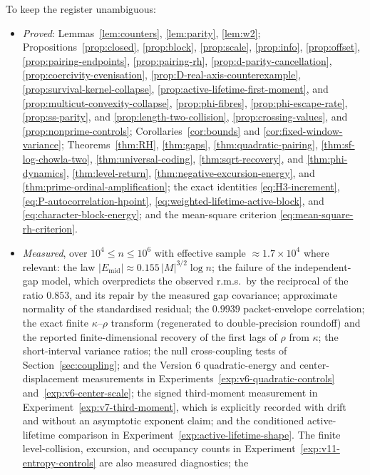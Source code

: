 \documentclass[11pt]{amsart}
\numberwithin{equation}{section}
\theoremstyle{plain}
\theoremstyle{definition}
\theoremstyle{remark}
\newcommand{\Mert}{M}
\begin{document}
To keep the register unambiguous:
\begin{itemize}[leftmargin=1.6em]
\item \emph{Proved}: Lemmas~\ref{lem:counters}, \ref{lem:parity}, \ref{lem:w2};
Propositions~\ref{prop:closed}, \ref{prop:block}, \ref{prop:scale},
\ref{prop:info}, \ref{prop:offset}, \ref{prop:pairing-endpoints},
\ref{prop:pairing-rh}, \ref{prop:d-parity-cancellation},
\ref{prop:coercivity-evenisation}, \ref{prop:D-real-axis-counterexample},
\ref{prop:survival-kernel-collapse}, \ref{prop:active-lifetime-first-moment},
and \ref{prop:multicut-convexity-collapse}, \ref{prop:phi-fibres},
\ref{prop:phi-escape-rate}, \ref{prop:ss-parity}, and
\ref{prop:length-two-collision}, \ref{prop:crossing-values}, and
\ref{prop:nonprime-controls}; Corollaries~\ref{cor:bounds} and
\ref{cor:fixed-window-variance}; Theorems~\ref{thm:RH}, \ref{thm:gaps},
\ref{thm:quadratic-pairing}, \ref{thm:sf-log-chowla-two},
\ref{thm:universal-coding}, \ref{thm:sqrt-recovery}, and
\ref{thm:phi-dynamics}, \ref{thm:level-return},
\ref{thm:negative-excursion-energy}, and
\ref{thm:prime-ordinal-amplification}; the exact
identities \eqref{eq:H3-increment}, \eqref{eq:P-autocorrelation-hpoint},
\eqref{eq:weighted-lifetime-active-block}, and
\eqref{eq:character-block-energy}; and the mean-square criterion
\eqref{eq:mean-square-rh-criterion}.
\item \emph{Measured}, over $10^{4}\le n\le10^{6}$ with effective sample
$\approx1.7\times10^{4}$ where relevant: the law
$|E_{\mathrm{mid}}|\approx0.155\,|\Mert|^{3/2}\log n$; the failure of the
independent-gap model, which overpredicts the observed r.m.s.\ by the reciprocal
of the ratio $0.853$, and its repair by the measured gap covariance; approximate normality of the standardised residual; the
$0.9939$ packet-envelope correlation; the exact finite $\kappa$--$\rho$ transform (regenerated to double-precision
roundoff) and the reported finite-dimensional recovery of the first lags of $\rho$
from $\kappa$; the short-interval variance ratios; the
null cross-coupling tests of Section~\ref{sec:coupling}; and the Version 6
quadratic-energy and center-displacement measurements in
Experiments~\ref{exp:v6-quadratic-controls} and~\ref{exp:v6-center-scale};
the signed third-moment measurement in Experiment~\ref{exp:v7-third-moment},
which is explicitly recorded with drift and without an asymptotic exponent claim;
and the conditioned active-lifetime comparison in
Experiment~\ref{exp:active-lifetime-shape}.
The finite level-collision, excursion, and occupancy counts in
Experiment~\ref{exp:v11-entropy-controls} are also measured diagnostics; the

\end{itemize}
\end{document}
